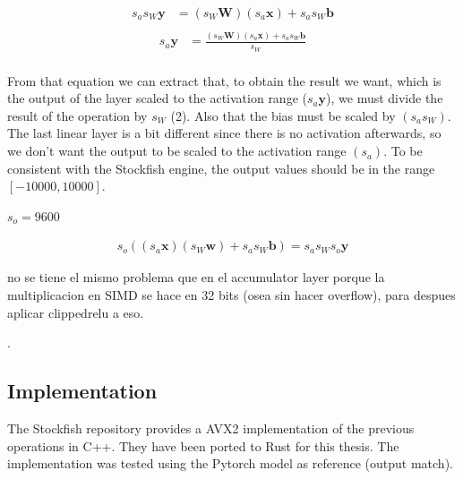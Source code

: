 \begin{equation}
\begin{aligned}
s_a s_W \bm{y} &= (s_W \bm{W}) (s_a \bm{x}) + s_a s_W \bm{b} \\
\end{aligned}
\end{equation}
\begin{equation}
\begin{aligned}
s_a \bm{y} &= \frac{(s_W \bm{W}) (s_a \bm{x}) + s_a s_W \bm{b}}{s_W} \\
\end{aligned}
\end{equation}

From that equation we can extract that, to obtain the result we want, which is the output of the layer scaled to the activation range ($s_a \bm{y}$), we must divide the result of the operation by $s_W$ (2). Also that the bias must be scaled by $(s_a s_W)$. \\

The last linear layer is a bit different since there is no activation afterwards, so we don't want the output to be scaled to the activation range $(s_a)$. To be consistent with the Stockfish engine, the output values should be in the range $[-10000,10000]$.




$s_o=9600$

\begin{equation}
\begin{aligned}
s_o ((s_a \bm{x}) (s_W \bm{w}) + s_a s_W \bm{b}) = s_a s_W s_o \bm{y}
\end{aligned}
\end{equation}







no se tiene el mismo problema que en el accumulator layer porque la multiplicacion en SIMD se hace en 32 bits (osea sin hacer overflow), para despues aplicar clippedrelu a eso.

. \\

\subsection{Implementation}

The Stockfish repository provides a AVX2 implementation of the previous operations in C++. They have been ported to Rust for this thesis. The implementation was tested using the Pytorch model as reference (output match).

